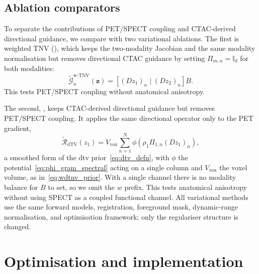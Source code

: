 \subsection{Ablation comparators}
\label{subsec:90y_ablations}

To separate the contributions of PET/SPECT coupling and CTAC-derived directional guidance, we compare \wdtnv with two variational ablations. The first is weighted TNV (\wtnv), which keeps the two-modality Jacobian and the same modality normalisation but removes directional CTAC guidance by setting $\Pi_{m,n}=\mathbb{I}_d$ for both modalities:
\begin{equation}
\tilde{\mathcal{G}}_n^{\mathrm{w\text{-}TNV}}(\bm{z})
=
\left[(D z_1)_n \;\Big|\; (D z_2)_n\right]B.
\end{equation}
This tests PET/SPECT coupling without anatomical anisotropy.

The second, \dtv, keeps CTAC-derived directional guidance but removes PET/SPECT coupling. It applies the same directional operator only to the PET gradient,
\begin{equation}
\widetilde{\mathcal{R}}_{\mathrm{dTV}}(z_1)
=
V_{\mathrm{vox}}
\sum_{n=1}^{N}
\phi\!\left(\rho_1\Pi_{1,n}(D z_1)_n\right),
\end{equation}
a smoothed form of the \gls{dtv} prior~\eqref{eq:dtv_defn}, with $\phi$ the potential~\eqref{eq:phi_gram_spectral} acting on a single column and $V_{\mathrm{vox}}$ the voxel volume, as in~\eqref{eq:wdtnv_prior}. With a single channel there is no modality balance for $B$ to set, so we omit the $w$ prefix. This tests anatomical anisotropy without using SPECT as a coupled functional channel. All variational methods use the same forward models, registration, foreground mask, dynamic-range normalisation, and optimisation framework; only the regulariser structure is changed.

\section{Optimisation and implementation}
\label{sec:90y_optimisation}

